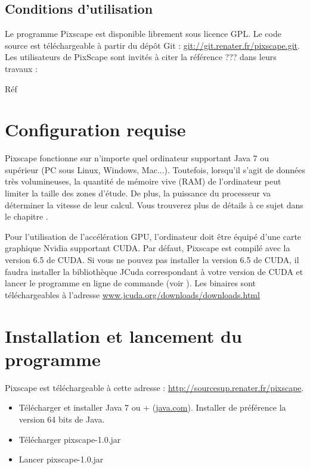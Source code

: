 \documentclass{report}
\begin{document}
\subsection{Conditions d’utilisation}
Le programme Pixscape est disponible librement sous licence GPL. Le code source est téléchargeable à partir du dépôt Git : \url{git://git.renater.fr/pixscape.git}.
Les utilisateurs de PixScape sont invités à citer la référence ??? dans leurs travaux :

Réf


\section{Configuration requise}

Pixscape fonctionne sur n'importe quel ordinateur supportant Java 7 ou supérieur (PC sous Linux, Windows, Mac...). Toutefois, lorsqu'il s'agit de données très volumineuses, la quantité de mémoire vive (RAM) de l’ordinateur peut limiter la taille des zones d'étude. De plus, la puissance du processeur va déterminer la vitesse de leur calcul. Vous trouverez plus de détails à ce sujet dans le chapitre . 

Pour l'utilisation de l'accélération GPU, l'ordinateur doit être équipé d'une carte graphique Nvidia supportant CUDA. Par défaut, Pixscape est compilé avec la version 6.5 de CUDA. Si vous ne pouvez pas installer la version 6.5 de CUDA, il faudra installer la bibliothèque JCuda correspondant à votre version de CUDA et lancer le programme en ligne de commande (voir ). Les binaires sont téléchargeables à l'adresse \href{http://www.jcuda.org/downloads/downloads.html}{www.jcuda.org/downloads/downloads.html}

\section{Installation et lancement du programme}

Pixscape est téléchargeable à cette adresse : \url{http://sourcesup.renater.fr/pixscape}.

\begin{itemize}
	\item Télécharger et installer Java 7 ou + (\href{http://www.java.com}{java.com}). Installer de préférence la version 64 bits de Java.
	\item Télécharger pixscape-1.0.jar
	\item Lancer pixscape-1.0.jar
\end{itemize}
\end{document}
